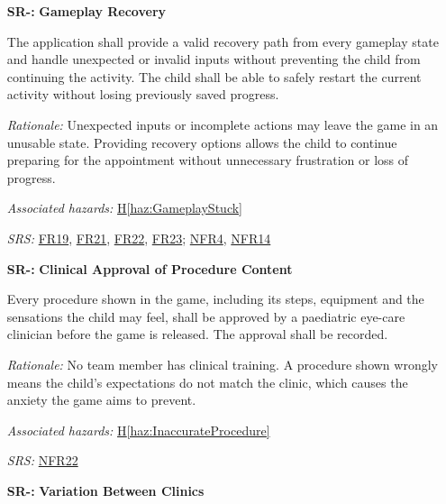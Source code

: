\documentclass{article}
\newcounter{hazard}
\newcommand{\hazref}[1]{\hyperref[haz:#1]{H\ref*{haz:#1}}}
\newcounter{sr}
\newcommand{\srdef}[1]{\refstepcounter{sr}\label{sr:#1}\textbf{SR-\thesr:}}
\newcommand{\srsurl}{https://team-hindsight.github.io/ophthamology-game/SRS-IEEE/SRS.pdf}
\newcommand{\srsfrref}[2]{\href{\srsurl\#nameddest=#1}{FR#2}}
\newcommand{\srsnfrref}[2]{\href{\srsurl\#nameddest=#1}{NFR#2}}
\begin{document}
\begin{itemize}[leftmargin=1.5cm, labelwidth=1.3cm, labelsep=0.2cm,
  align=left, itemsep=1.2em, parsep=0.6em]
\textit{Rationale:}
Young children may repeatedly tap the screen
while interacting with the game. If multiple
inputs are processed unintentionally, the child
may skip important explanations about an
ophthalmology procedure. Preventing accidental
navigation helps ensure children receive the
necessary preparation information.

\textit{Associated hazards:}
\hazref{AccidentalInputSkipping}

\textit{SRS:} \srsfrref{FR_IgnoreRepeatedTouches}{18}; \srsnfrref{NFR_Responsiveness}{10}

\item[\srdef{GameplayRecovery}]
\textbf{Gameplay Recovery}

The application shall provide a valid recovery path from every
gameplay state and handle unexpected or invalid inputs without
preventing the child from continuing the activity. The child
shall be able to safely restart the current activity without
losing previously saved progress.

\textit{Rationale:}
Unexpected inputs or incomplete actions may leave the game
in an unusable state. Providing recovery options allows the
child to continue preparing for the appointment without
unnecessary frustration or loss of progress.

\textit{Associated hazards:}
\hazref{GameplayStuck}

\textit{SRS:} \srsfrref{FR_ExitLevel}{19}, \srsfrref{FR_ExitKeepsData}{21}, \srsfrref{FR_RestartAfterExit}{22}, \srsfrref{FR_RestartLevel}{23}; \srsnfrref{NFR_Exit}{4}, \srsnfrref{NFR_Reliability}{14}

\item[\srdef{ClinicianApproval}] \textbf{Clinical Approval of Procedure Content}

Every procedure shown in the game, including its steps, equipment and the
sensations the child may feel, shall be approved by a paediatric eye-care
clinician before the game is released. The approval shall be recorded.

\textit{Rationale:} No team member has clinical training. A procedure shown
wrongly means the child's expectations do not match the clinic, which causes
the anxiety the game aims to prevent.

\textit{Associated hazards:} \hazref{InaccurateProcedure}

\textit{SRS:} \srsnfrref{NFR_Integrity}{22}

\item[\srdef{ClinicsDiffer}] \textbf{Variation Between Clinics}


\end{itemize}
\end{document}
